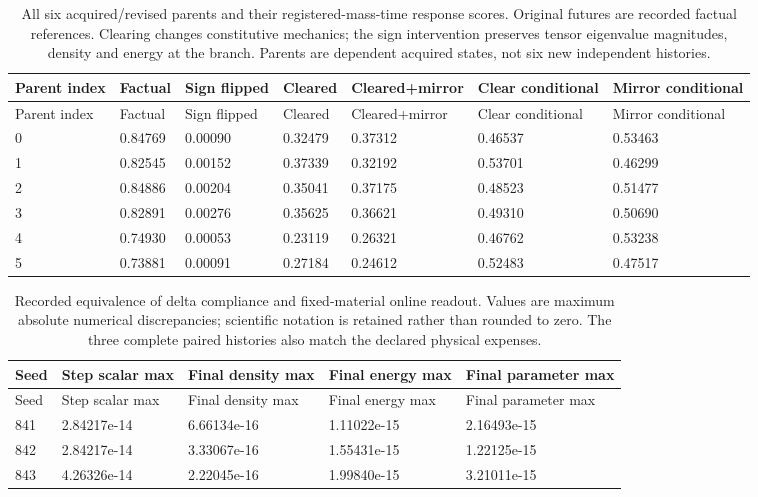 \begin{longtable}{lllllll}
\caption{All six acquired/revised parents and their registered-mass-time response scores. Original futures are recorded factual references. Clearing changes constitutive mechanics; the sign intervention preserves tensor eigenvalue magnitudes, density and energy at the branch. Parents are dependent acquired states, not six new independent histories.}\label{tab:physical-state-content}\\
\toprule
Parent index & Factual & Sign flipped & Cleared & Cleared+mirror & Clear conditional & Mirror conditional \\
\midrule
\endfirsthead
\toprule
Parent index & Factual & Sign flipped & Cleared & Cleared+mirror & Clear conditional & Mirror conditional \\
\midrule
\endhead
0 & 0.84769 & 0.00090 & 0.32479 & 0.37312 & 0.46537 & 0.53463 \\
1 & 0.82545 & 0.00152 & 0.37339 & 0.32192 & 0.53701 & 0.46299 \\
2 & 0.84886 & 0.00204 & 0.35041 & 0.37175 & 0.48523 & 0.51477 \\
3 & 0.82891 & 0.00276 & 0.35625 & 0.36621 & 0.49310 & 0.50690 \\
4 & 0.74930 & 0.00053 & 0.23119 & 0.26321 & 0.46762 & 0.53238 \\
5 & 0.73881 & 0.00091 & 0.27184 & 0.24612 & 0.52483 & 0.47517 \\
\bottomrule
\end{longtable}
\begin{longtable}{lllll}
\caption{Recorded equivalence of delta compliance and fixed-material online readout. Values are maximum absolute numerical discrepancies; scientific notation is retained rather than rounded to zero. The three complete paired histories also match the declared physical expenses.}\label{tab:physical-state-equivalence}\\
\toprule
Seed & Step scalar max & Final density max & Final energy max & Final parameter max \\
\midrule
\endfirsthead
\toprule
Seed & Step scalar max & Final density max & Final energy max & Final parameter max \\
\midrule
\endhead
841 & 2.84217e-14 & 6.66134e-16 & 1.11022e-15 & 2.16493e-15 \\
842 & 2.84217e-14 & 3.33067e-16 & 1.55431e-15 & 1.22125e-15 \\
843 & 4.26326e-14 & 2.22045e-16 & 1.99840e-15 & 3.21011e-15 \\
\bottomrule
\end{longtable}

